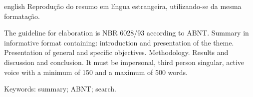 \begin{resumo}[Abstract]
 \begin{otherlanguage*}{english}
    Reprodução do resumo em língua estrangeira, utilizando-se da mesma formatação.
    
    The guideline for elaboration is NBR 6028/93 according to ABNT. Summary in informative format containing: introduction and presentation of the theme. Presentation of general and specific objectives. Methodology. Results and discussion and conclusion. It must be impersonal, third person singular, active voice with a minimum of 150 and a maximum of 500 words.
    
    Keywords: summary; ABNT; search.
 \end{otherlanguage*}
\end{resumo}

